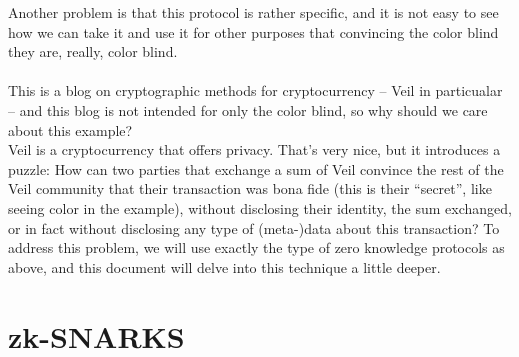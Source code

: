\documentclass[11pt,oneside]{article}
\theoremstyle{definition}
\theoremstyle{remark}
\numberwithin{equation}{section}
\begin{document}
Another problem is that this protocol is rather specific, and it is not easy to
see how we can take it and use it for other purposes that convincing the color
blind they are, really, color blind.\\
\\
This is a blog on cryptographic methods for cryptocurrency -- Veil in
particualar -- and this blog is not intended for only the color blind, so why
should we care about this example?\\
Veil is a cryptocurrency that offers privacy. That's very nice, but it introduces
a puzzle: How can two parties that exchange a sum of Veil convince the rest of
the Veil community that their transaction was bona fide (this is their
``secret'', like seeing color in the example), without disclosing
their identity, the sum exchanged, or in fact without disclosing any type of
(meta-)data about this transaction? To address this problem, we will use exactly
the type of zero knowledge protocols as above, and this document will delve into
this technique a little deeper.
\section{zk-SNARKS}\label{sec:zksnarks} 
\end{document}
